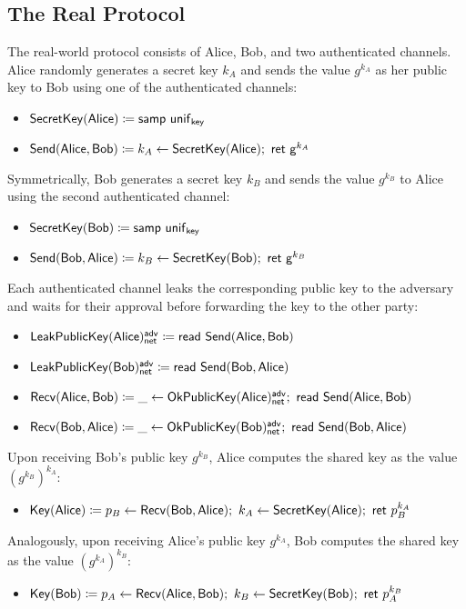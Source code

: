 \subsection{The Real Protocol}
The real-world protocol consists of Alice, Bob, and two authenticated channels. Alice randomly generates a secret key $k_A$ and sends the value $g^{k_A}$ as her public key to Bob using one of the authenticated channels:
\begin{itemize}
\item $\mathsf{SecretKey}(\mathsf{Alice}) \coloneqq \mathsf{samp} \ \mathsf{unif}_{\mathsf{key}}$
\item $\mathsf{Send}(\mathsf{Alice},\mathsf{Bob}) \coloneqq k_A \leftarrow \mathsf{SecretKey}(\mathsf{Alice}); \ \mathsf{ret} \ \mathsf{g}^{k_A}$
\end{itemize}
Symmetrically, Bob generates a secret key $k_B$ and sends the value $g^{k_B}$ to Alice using the second authenticated channel:
\begin{itemize}
\item $\mathsf{SecretKey}(\mathsf{Bob}) \coloneqq \mathsf{samp} \ \mathsf{unif}_{\mathsf{key}}$
\item $\mathsf{Send}(\mathsf{Bob},\mathsf{Alice}) \coloneqq k_B \leftarrow \mathsf{SecretKey}(\mathsf{Bob}); \ \mathsf{ret} \ \mathsf{g}^{k_B}$
\end{itemize}
Each authenticated channel leaks the corresponding public key to the adversary and waits for their approval before forwarding the key to the other party:
\begin{itemize}
\item $\mathsf{LeakPublicKey}(\mathsf{Alice})^{\mathsf{adv}}_{\mathsf{net}} \coloneqq \mathsf{read} \ \mathsf{Send}(\mathsf{Alice},\mathsf{Bob})$
\item $\mathsf{LeakPublicKey}(\mathsf{Bob})^{\mathsf{adv}}_{\mathsf{net}} \coloneqq \mathsf{read} \ \mathsf{Send}(\mathsf{Bob},\mathsf{Alice})$
\item $\Recv(\Alice,\Bob) \coloneqq \_ \leftarrow \OkPublicKey(\Alice)^\adv_\net; \ \read{\Send(\Alice,\Bob)}$
\item $\Recv(\Bob,\Alice) \coloneqq \_ \leftarrow \OkPublicKey(\Bob)^\adv_\net; \ \read{\Send(\Bob,\Alice)}$
\end{itemize}
Upon receiving Bob's public key $g^{k_B}$, Alice computes the shared key as the value $(g^{k_B})^{k_A}$:
\begin{itemize}
\item $\Key(\Alice) \coloneqq p_B \leftarrow \Recv(\Bob,\Alice); \ k_A \leftarrow \SecretKey(\Alice); \ \ret{p_B^{k_A}}$
\end{itemize}
Analogously, upon receiving Alice's public key $g^{k_A}$, Bob computes the shared key as the value $(g^{k_A})^{k_B}$:
\begin{itemize}
\item $\Key(\Bob) \coloneqq p_A \leftarrow \Recv(\Alice,\Bob); \ k_B \leftarrow \SecretKey(\Bob); \ \ret{p_A^{k_B}}$
\end{itemize}
